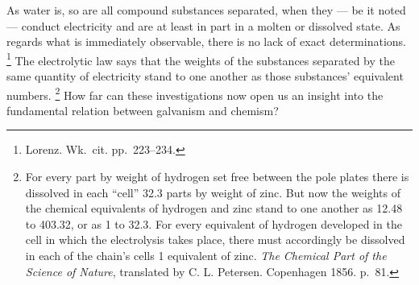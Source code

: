 \documentclass[12pt,a4paper]{book}
\renewcommand{\thefootnote}{*)}
\begin{document}
As water is, so are all compound substances separated, when they --- be it noted --- conduct electricity and are at least
in part in a molten or dissolved state. As regards what is immediately observable, there is no lack of exact
determinations.%
\footnote{%
Lorenz. Wk.\ cit. pp.\ 223--234.}
The electrolytic law says that the weights of the substances separated by the same quantity of electricity stand to one
another as those substances' equivalent numbers.%
\renewcommand{\thefootnote}{**)}%
\footnote{%
For every part by weight of hydrogen set free between the pole plates there is dissolved in each ``cell'' 32.3 parts by
weight of zinc. But now the weights of the chemical equivalents of hydrogen and zinc stand to one another as 12.48 to
403.32, or as 1 to 32.3. For every equivalent of hydrogen developed in the cell in which the electrolysis takes place,
there must accordingly be dissolved in each of the chain's cells 1 equivalent of zinc. \emph{The Chemical Part of the
Science of Nature}, translated by C. L. Petersen. Copenhagen 1856. p.\ 81.}%
\renewcommand{\thefootnote}{*)}
How far can these investigations now open us an insight into the fundamental relation between galvanism and chemism?
\end{document}
